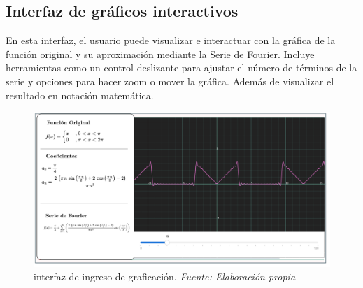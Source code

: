 \subsection{Interfaz de gráficos interactivos}
En esta interfaz, el usuario puede visualizar e interactuar con la gráfica de la función original y su aproximación mediante la Serie de Fourier. Incluye herramientas como un control deslizante para ajustar el número de términos de la serie y opciones para hacer zoom o mover la gráfica. Además de visualizar el resultado en notación matemática.
\begin{figure}[H]
	\centering
	\includegraphics[width=1\textwidth]{img/chapter04/mockup_grafica.png}
	\caption[Interfaz de ingreso de graficación.]{interfaz de ingreso de graficación. \textit{Fuente: \textit{Elaboración propia}}}
	\label{fig:mockup_grafica}
\end{figure}

